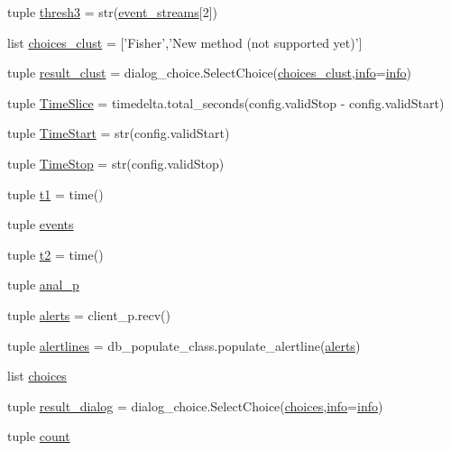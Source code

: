 \begin{DoxyCompactItemize}
tuple \hyperlink{namespacerun__archival__gui_a74997656480908b3c860d53d2b06c6b5}{thresh3} = str(\hyperlink{namespacerun__archival__gui_a663b3af69401dfd54271cd973d0bb968}{event\-\_\-streams}\mbox{[}2\mbox{]})
\item 
list \hyperlink{namespacerun__archival__gui_a4abdf77bd62302aa406c3109694e07b8}{choices\-\_\-clust} = \mbox{[}'Fisher','New method (not supported yet)'\mbox{]}
\item 
tuple \hyperlink{namespacerun__archival__gui_a06b1db0dac381a36a3d08d53e32cef14}{result\-\_\-clust} = dialog\-\_\-choice.\-Select\-Choice(\hyperlink{namespacerun__archival__gui_a4abdf77bd62302aa406c3109694e07b8}{choices\-\_\-clust},\hyperlink{namespacerun__archival__gui_ad1643ab4eafe2c9327907387e49d1763}{info}=\hyperlink{namespacerun__archival__gui_ad1643ab4eafe2c9327907387e49d1763}{info})
\item 
tuple \hyperlink{namespacerun__archival__gui_acc1fabeb046529cb059968a74ee28886}{Time\-Slice} = timedelta.\-total\-\_\-seconds(config.\-valid\-Stop -\/ config.\-valid\-Start)
\item 
tuple \hyperlink{namespacerun__archival__gui_abae7c9a7fe9ae6b56c4ceab0757610a4}{Time\-Start} = str(config.\-valid\-Start)
\item 
tuple \hyperlink{namespacerun__archival__gui_a010097e05cebeb13d608b126cfa3c7a8}{Time\-Stop} = str(config.\-valid\-Stop)
\item 
tuple \hyperlink{namespacerun__archival__gui_af91f95bd327e5d074319142c030b1828}{t1} = time()
\item 
tuple \hyperlink{namespacerun__archival__gui_a2b12ba57b71812997e5dd0f627c6b7fe}{events}
\item 
tuple \hyperlink{namespacerun__archival__gui_a7f38eabe30ed0eff6aec3000df2d83e3}{t2} = time()
\item 
tuple \hyperlink{namespacerun__archival__gui_a7be598f74e925475644c60e7d7de9f85}{anal\-\_\-p}
\item 
tuple \hyperlink{namespacerun__archival__gui_a3e4b04aca47acb89e6fa3ae1b54ced46}{alerts} = client\-\_\-p.\-recv()
\item 
tuple \hyperlink{namespacerun__archival__gui_aed1f848fe03adbd8a175023f71246c2f}{alertlines} = db\-\_\-populate\-\_\-class.\-populate\-\_\-alertline(\hyperlink{namespacerun__archival__gui_a3e4b04aca47acb89e6fa3ae1b54ced46}{alerts})
\item 
list \hyperlink{namespacerun__archival__gui_a2d228f17b955250b06a982284ad9fdf6}{choices}
\item 
tuple \hyperlink{namespacerun__archival__gui_a8150e0f3711f1ecc9f609f017904320c}{result\-\_\-dialog} = dialog\-\_\-choice.\-Select\-Choice(\hyperlink{namespacerun__archival__gui_a2d228f17b955250b06a982284ad9fdf6}{choices},\hyperlink{namespacerun__archival__gui_ad1643ab4eafe2c9327907387e49d1763}{info}=\hyperlink{namespacerun__archival__gui_ad1643ab4eafe2c9327907387e49d1763}{info})
\item 
tuple \hyperlink{namespacerun__archival__gui_aa8935b1559e71c8b6fb48106b2129880}{count}
\end{DoxyCompactItemize}


